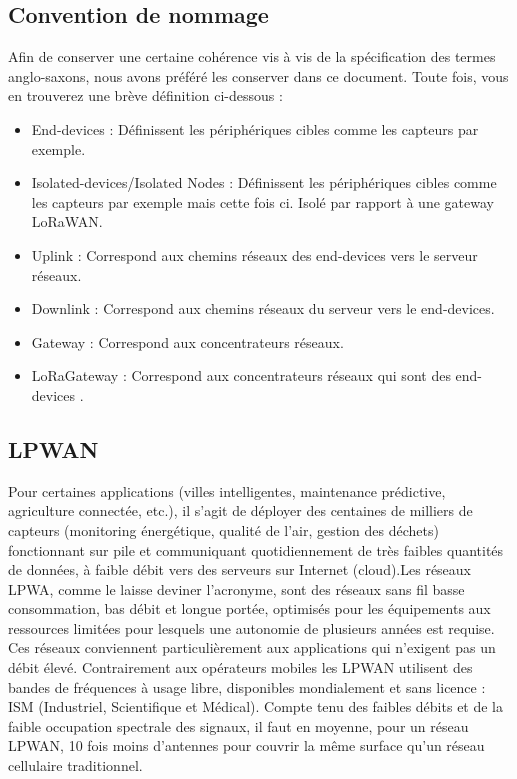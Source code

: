 \documentclass[11pt]{article}
\begin{document}
\subsection{Convention de nommage }
Afin de conserver une certaine cohérence vis à vis de la spécification des termes anglo-saxons, nous avons préféré les conserver dans ce document. Toute fois, vous en trouverez une brève définition ci-dessous : 
\begin{itemize}
\item End-devices : Définissent les périphériques cibles comme les capteurs par exemple.
\item Isolated-devices/Isolated Nodes : Définissent les périphériques cibles comme les capteurs par exemple  mais cette fois ci. Isolé par rapport à une gateway LoRaWAN.
\item Uplink : Correspond aux chemins réseaux des end-devices vers le serveur réseaux. 
\item Downlink : Correspond aux chemins réseaux du serveur vers le end-devices. 
\item Gateway : Correspond aux concentrateurs réseaux. 
\item LoRaGateway : Correspond aux concentrateurs réseaux qui sont des end-devices . 
\end{itemize}



\subsection{LPWAN}
Pour certaines applications (villes intelligentes, maintenance prédictive, agriculture connectée, etc.), il s'agit de déployer des centaines de milliers de capteurs (monitoring énergétique, qualité de l'air, gestion des déchets) fonctionnant sur pile et communiquant quotidiennement de très faibles quantités de données, à faible débit vers des serveurs sur Internet (cloud).Les réseaux LPWA, comme le laisse deviner l'acronyme, sont des réseaux sans fil basse consommation, bas débit et longue portée, optimisés pour les équipements aux ressources limitées pour lesquels une autonomie de plusieurs années est requise. Ces réseaux conviennent particulièrement aux applications qui n'exigent pas un débit élevé.
Contrairement aux opérateurs mobiles les LPWAN utilisent des bandes de fréquences à usage libre, disponibles mondialement et sans licence : ISM (Industriel, Scientifique et Médical). Compte tenu des faibles débits et de la faible occupation spectrale des signaux, il faut en moyenne, pour un réseau LPWAN, 10 fois moins d'antennes pour couvrir la même surface qu'un réseau cellulaire traditionnel.
\end{document}
